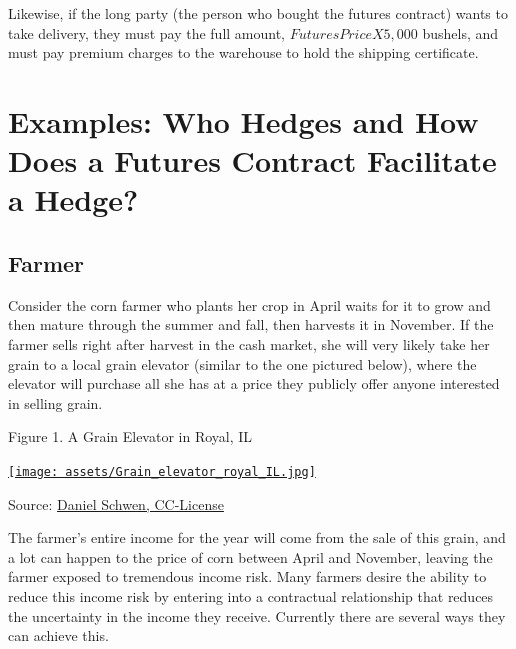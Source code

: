 \documentclass[
]{book}
\begin{document}
Likewise, if the long party (the person who bought the futures contract) wants to take delivery, they must pay the full amount, \(Futures Price X 5,000\) bushels, and must pay premium charges to the warehouse to hold the shipping certificate.

\hypertarget{examples-who-hedges-and-how-does-a-futures-contract-facilitate-a-hedge}{%
\section{Examples: Who Hedges and How Does a Futures Contract Facilitate a Hedge?}\label{examples-who-hedges-and-how-does-a-futures-contract-facilitate-a-hedge}}

\hypertarget{farmer}{%
\subsection{Farmer}\label{farmer}}

Consider the corn farmer who plants her crop in April waits for it to grow and then mature through the summer and fall, then harvests it in November. If the farmer sells right after harvest in the cash market, she will very likely take her grain to a local grain elevator (similar to the one pictured below), where the elevator will purchase all she has at a price they publicly offer anyone interested in selling grain.

Figure 1. A Grain Elevator in Royal, IL

\href{https://commons.wikimedia.org/wiki/File:Grain_elevators_in_Royal,_IL.}{\texttt{[image: assets/Grain\_elevator\_royal\_IL.jpg]}}

Source: \href{https://commons.wikimedia.org/wiki/File\%3AGrain_elevators_in_Royal\%2C_IL.jpg}{Daniel Schwen, CC-License}

The farmer's entire income for the year will come from the sale of this grain, and a lot can happen to the price of corn between April and November, leaving the farmer exposed to tremendous income risk. Many farmers desire the ability to reduce this income risk by entering into a contractual relationship that reduces the uncertainty in the income they receive. Currently there are several ways they can achieve this.
\end{document}

